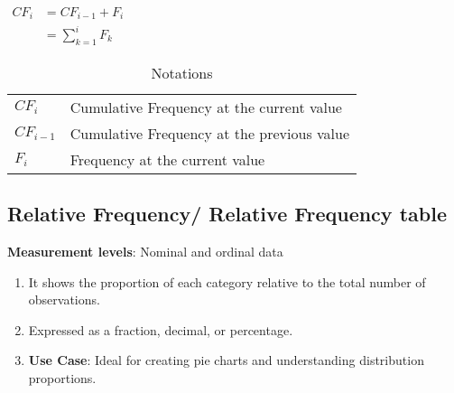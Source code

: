 \begin{table}[H]
    \begin{minipage}[H]{0.3\linewidth}
    $
        \begin{aligned}
            CF_i 
                &= CF_{i-1} + F_{i} \\
                &= \sum_{k=1}^{i} F_{k}
        \end{aligned}
    $
    \end{minipage}
    \begin{minipage}[H]{0.65\linewidth}
        \begin{table}[H]
            \begin{tabular}{l l}
                $CF_i$ & Cumulative Frequency at the current value \\ 
                $CF_{i-1}$ & Cumulative Frequency at the previous value \\ 
                $F_i$ & Frequency at the current value \\ 
            \end{tabular}
            \caption*{Notations}
        \end{table}
    \end{minipage}
\end{table}


\subsection{Relative Frequency/ Relative Frequency table \cite{statistics/book/Statistics-for-Data-Scientists/Maurits-Kaptein}}\label{Data/Describing Data/Relative Frequency or Relative Frequency table}

\textbf{Measurement levels}: Nominal and ordinal data

\vspace{0.3cm}
\begin{enumerate}
    \item It shows the proportion of each category relative to the total number of observations. \cite{common/online/chatgpt}

    \item Expressed as a fraction, decimal, or percentage. \cite{common/online/chatgpt}

    \item \textbf{Use Case}: Ideal for creating pie charts and understanding distribution proportions. \cite{common/online/chatgpt}
\end{enumerate}


